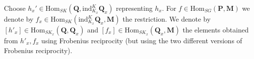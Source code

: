 \documentclass[10pt]{amsart}
\newcommand{\Ad}{\mathrm{Ad}}
\newcommand{\Hom}{\mathrm{Hom}}
\newcommand{\ind}{\mathrm{ind}}
\theoremstyle{remark}
\begin{document}

%
%
%
%
 
 \proof Choose $h_x'  \in \Hom_{SK}(\mathbf{Q},  \ind_{K_x}^K \mathbf{Q}_x) $ representing $h_x$. For $f \in  \Hom_{SG}(\mathbf{P}, \mathbf{M})$
 we denote by $f_x \in \Hom_{SK}(\ind_{K_x}^{K} \mathbf{Q}_x,\mathbf{M}) $ the restriction. 
 We denote by $[h'_x] \in  \Hom_{SK_x}(\mathbf{Q}, \mathbf{Q}_x) $
 and $[f_x]    \in \Hom_{SK_x}(\mathbf{Q}_x, \mathbf{M}) $ the elements obtained from $h'_x, f_x$ using Frobenius reciprocity (but using the two different versions of Frobenius reciprocity). 
 
 
  
\end{document}
